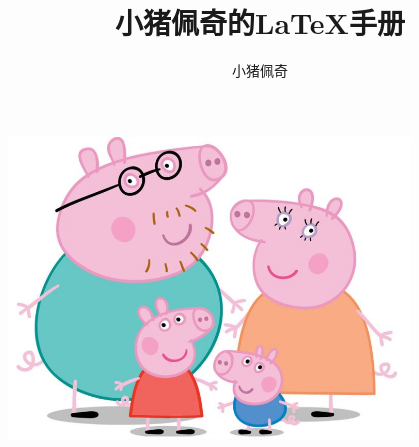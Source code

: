 \documentclass[12pt,a4paper]{article}
\title{小猪佩奇的\LaTeX 手册}
\author{小猪佩奇}
\newcommand{\clearpagestyle}[0]{\thispagestyle{empty}}
\begin{document}
\large

\begin{titlepage}
    \maketitle\clearpagestyle
    \begin{center}
        \vspace{14em}
        \includegraphics[width=0.8\textwidth]{img/home.jpg}
    \end{center}
    \newpage{}\tableofcontents
    \newpage{}
\end{titlepage}




 
\end{document}
